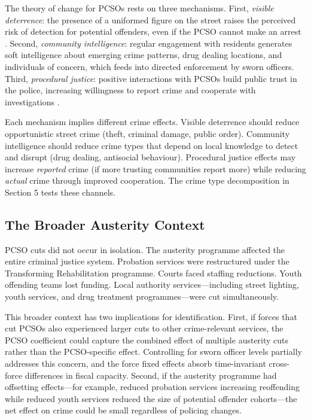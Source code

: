 \documentclass[12pt]{article}
\begin{document}
The theory of change for PCSOs rests on three mechanisms. First, \textit{visible deterrence}: the presence of a uniformed figure on the street raises the perceived risk of detection for potential offenders, even if the PCSO cannot make an arrest \citep{nagin2013deterrence}. Second, \textit{community intelligence}: regular engagement with residents generates soft intelligence about emerging crime patterns, drug dealing locations, and individuals of concern, which feeds into directed enforcement by sworn officers. Third, \textit{procedural justice}: positive interactions with PCSOs build public trust in the police, increasing willingness to report crime and cooperate with investigations \citep{tyler2004enhancing, bradford2014policing}.

Each mechanism implies different crime effects. Visible deterrence should reduce opportunistic street crime (theft, criminal damage, public order). Community intelligence should reduce crime types that depend on local knowledge to detect and disrupt (drug dealing, antisocial behaviour). Procedural justice effects may increase \textit{reported} crime (if more trusting communities report more) while reducing \textit{actual} crime through improved cooperation. The crime type decomposition in Section 5 tests these channels.

\subsection{The Broader Austerity Context}

PCSO cuts did not occur in isolation. The austerity programme affected the entire criminal justice system. Probation services were restructured under the Transforming Rehabilitation programme. Courts faced staffing reductions. Youth offending teams lost funding. Local authority services---including street lighting, youth services, and drug treatment programmes---were cut simultaneously.

This broader context has two implications for identification. First, if forces that cut PCSOs also experienced larger cuts to other crime-relevant services, the PCSO coefficient could capture the combined effect of multiple austerity cuts rather than the PCSO-specific effect. Controlling for sworn officer levels partially addresses this concern, and the force fixed effects absorb time-invariant cross-force differences in fiscal capacity. Second, if the austerity programme had offsetting effects---for example, reduced probation services increasing reoffending while reduced youth services reduced the size of potential offender cohorts---the net effect on crime could be small regardless of policing changes.
\end{document}
